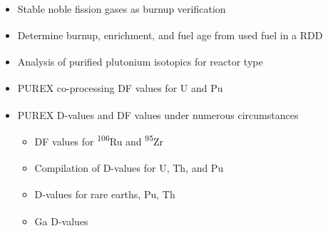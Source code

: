 \documentclass{beamer}
\newcommand{\tss}{\textsuperscript}
\begin{document}
\begin{frame}
  \begin{itemize}
  \item{Stable noble fission gases as burnup verification\tss{\cite{RN114}}}
  \item{Determine burnup, enrichment, and fuel age from used fuel in a RDD\tss{\cite{RN118}}}
  \item{Analysis of purified plutonium isotopics for reactor type\tss{\cite{RN109}}}
  \item{PUREX co-processing DF values for U and Pu\tss{\cite{RN123}}}
  \item{PUREX D-values and DF values under numerous
    circumstances\tss{\cite{benedict1982nuclear,RN169,RN167,RN168,RN177,stoller1961reactor}}}
    \begin{itemize}
    \item{DF values for \tss{106}Ru and \tss{95}Zr\tss{\cite{stoller1961reactor}}}
    \item{Compilation of D-values for U, Th, and Pu\tss{\cite{RN208}}}
    \item{D-values for rare earths, Pu,
      Th\tss{\cite{RN168,RN181,RN182,RN186,RN179,RN180,RN187,RN185,RN183,RN189}}}
    \item{Ga D-values\tss{\cite{RN189}}}
    \end{itemize}
  \end{itemize}
\end{frame}



\end{document}
